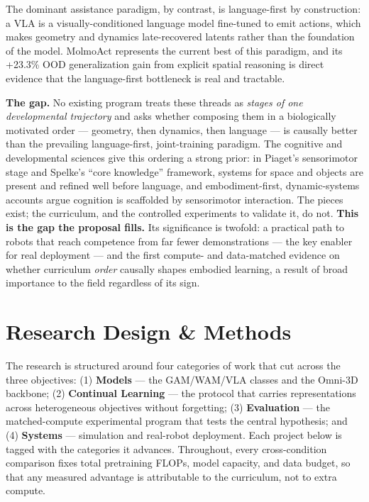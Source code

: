 \documentclass[11pt]{article}
\begin{document}
The dominant assistance paradigm, by contrast, is language-first by construction: a VLA is a visually-conditioned language model fine-tuned to emit actions,\cite{brohan2023rt2,openvla,pi0} which makes geometry and dynamics late-recovered latents rather than the foundation of the model. MolmoAct\cite{molmoact} represents the current best of this paradigm, and its +23.3\% OOD generalization gain from explicit spatial reasoning is direct evidence that the language-first bottleneck is real and tractable.

\textbf{The gap.} No existing program treats these threads as \emph{stages of one developmental trajectory} and asks whether composing them in a biologically motivated order --- geometry, then dynamics, then language --- is causally better than the prevailing language-first, joint-training paradigm. The cognitive and developmental sciences give this ordering a strong prior: in Piaget's sensorimotor stage\cite{piaget1952} and Spelke's ``core knowledge'' framework,\cite{spelke2007} systems for space and objects are present and refined well before language, and embodiment-first, dynamic-systems accounts argue cognition is scaffolded by sensorimotor interaction.\cite{thelen1994} The pieces exist; the curriculum, and the controlled experiments to validate it, do not. \textbf{This is the gap the proposal fills.} Its significance is twofold: a practical path to robots that reach competence from far fewer demonstrations --- the key enabler for real deployment --- and the first compute- and data-matched evidence on whether curriculum \emph{order} causally shapes embodied learning, a result of broad importance to the field regardless of its sign.

\section{Research Design \& Methods}

The research is structured around four categories of work that cut across the three objectives: (1) \textbf{Models} --- the GAM/WAM/VLA classes and the Omni-3D backbone; (2) \textbf{Continual Learning} --- the protocol that carries representations across heterogeneous objectives without forgetting; (3) \textbf{Evaluation} --- the matched-compute experimental program that tests the central hypothesis; and (4) \textbf{Systems} --- simulation and real-robot deployment. Each project below is tagged with the categories it advances. Throughout, every cross-condition comparison fixes total pretraining FLOPs, model capacity, and data budget, so that any measured advantage is attributable to the curriculum, not to extra compute.
\end{document}
